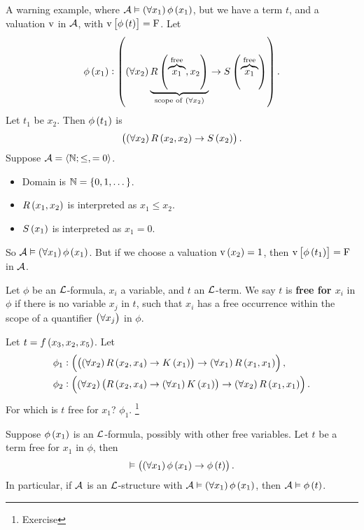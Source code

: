 \pagebreak

\begin{example*}
A warning example, where $ \AAA \vDash \fab{x_1}\phi\br{x_1} $, but we have a term $ t $, and a valuation $ \mathrm{v} $ in $ \mathcal{A} $, with $ \v\sbr{\phi\br{t}} = \F $. Let
$$ \phi\br{x_1} : \impb{\fab{x_2}\underbrace{R\br{\overbrace{x_1}^{\text{free}}, x_2}}_{\text{scope of} \ \fab{x_2}}}{S\br{\overbrace{x_1}^{\text{free}}}}. $$
Let $ t_1 $ be $ x_2 $. Then $ \phi\br{t_1} $ is
$$ \impb{\fab{x_2}R\br{x_2, x_2}}{S\br{x_2}}. $$
Suppose $ \mathcal{A} = \left\langle \mathbb{N}; \le, = 0 \right\rangle $.
\begin{itemize}
\item Domain is $ \NN = \cbr{0, 1, \dots} $.
\item $ R\br{x_1, x_2} $ is interpreted as $ x_1 \le x_2 $.
\item $ S\br{x_1} $ is interpreted as $ x_1 = 0 $.
\end{itemize}
So $ \AAA \vDash \fab{x_1}\phi\br{x_1} $. But if we choose a valuation $ \v\br{x_2} = 1 $, then $ \v\sbr{\phi\br{t_1}} = \F $ in $ \mathcal{A} $.
\end{example*}

\begin{definition}
Let $ \phi $ be an $ \mathcal{L} $-formula, $ x_i $ a variable, and $ t $ an $ \mathcal{L} $-term. We say $ t $ is \textbf{free for $ x_i $} in $ \phi $ if there is no variable $ x_j $ in $ t $, such that $ x_i $ has a free occurrence within the scope of a quantifier $ \fab{x_j} $ in $ \phi $.
\end{definition}

\begin{example*}
Let $ t = f\br{x_3, x_2, x_5} $. Let
\begin{align*}
\phi_1 & : \impb{\impb{\fab{x_2}R\br{x_2, x_4}}{K\br{x_1}}}{\fab{x_1}R\br{x_1, x_1}}, \\
\phi_2 & : \impb{\fab{x_2}\impb{R\br{x_2, x_4}}{\fab{x_1}K\br{x_1}}}{\fab{x_2}R\br{x_1, x_1}}.
\end{align*}
For which is $ t $ free for $ x_1 $? $ \phi_1 $. \footnote{Exercise}
\end{example*}

\begin{theorem}
\label{thm:2.3.6}
Suppose $ \phi\br{x_1} $ is an $ \mathcal{L} $-formula, possibly with other free variables. Let $ t $ be a term free for $ x_1 $ in $ \phi $, then
$$ \vDash \impb{\fab{x_1}\phi\br{x_1}}{\phi\br{t}}. $$
In particular, if $ \mathcal{A} $ is an $ \mathcal{L} $-structure with $ \AAA \vDash \fab{x_1}\phi\br{x_1} $, then $ \AAA \vDash \phi\br{t} $.
\end{theorem}

